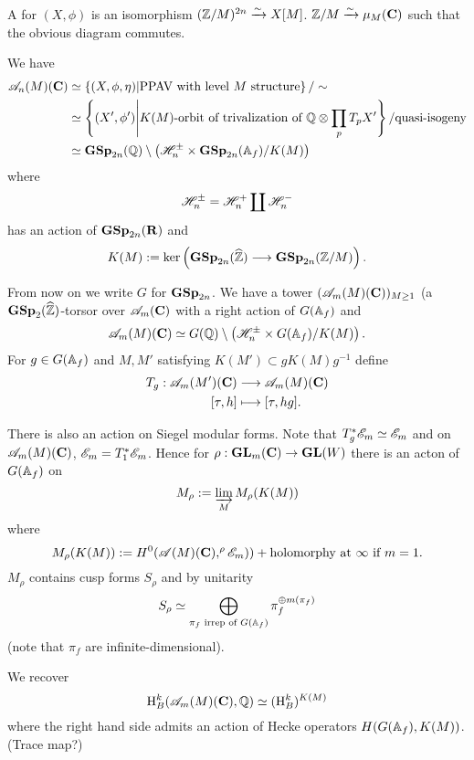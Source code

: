 \begin{definition}
	A  for $(X,\phi)$ is an isomorphism $(\mathbb Z /M)^{2n}\xrightarrow{\sim} X[M]$. $\mathbb Z /M\xrightarrow{\sim} \mu_M(\mathbf{C})$ such that the obvious diagram commutes.
\end{definition}
We have
\begin{align*}
	\mathscr{A}_n(M)(\mathbf{C}) &\simeq \left\{ (X,\phi,\eta) \middle| \text{PPAV with level }M\text{ structure} \right\} / \sim \\
			 &\simeq \left\{ (X',\phi') \middle| K(M)\text{-orbit of trivalization of }\mathbb Q\otimes \prod_p T_pX' \right\} / \text{quasi-isogeny} \\
			 &\simeq \mathbf{GSp}_{2n}(\mathbb Q) \setminus \left( \mathscr H_n^{\pm}\times \mathbf{GSp}_{2n}(\mathbb{A}_f) /K(M) \right) 
\end{align*}
where
\[
	\mathscr H_n^{\pm} = \mathscr H_n^{+} \coprod \mathscr H_n^{-}
\] 
has an action of $\mathbf{GSp}_{2n}(\mathbf{R})$ and
\[
	K(M) \defeq \ker \left( \GSp_{2n}(\wh{\Z}) \to \GSp_{2n}(\Z /M) \right) .
\] 

From now on we write $G$ for $\mathbf{GSp}_{2n}$.
We have a tower $(\mathscr{A}_m(M)(\mathbf{C}))_{M\ge 1}$ (a $\mathbf{GSp}_2(\widehat{\mathbb Z})$-torsor over $\mathscr{A}_m(\mathbf{C})$ with a right action of $G(\mathbb{A}_f)$ and
\[
	\mathscr{A}_m(M)(\mathbf{C}) \simeq G(\mathbb Q) \setminus \left( \mathscr H_n^{\pm} \times G(\mathbb{A}_f) /K(M) \right) .
\] 
For $g\in G(\mathbb{A}_f)$ and $M,M'$ satisfying $K(M')\subset gK(M)g^{-1}$ define
\begin{align*}
	T_g: \mathscr{A}_m(M')(\mathbf{C}) &\longrightarrow \mathscr{A}_m(M)(\mathbf{C}) \\
	[\tau, h] &\longmapsto [\tau, hg].
\end{align*}

There is also an action on Siegel modular forms. Note that $T_g^{*}\mathscr{E}_m\simeq \mathscr{E}_m$ and on $\mathscr{A}_m(M)(\mathbf{C})$, $\mathscr{E}_m=T_1^{*}\mathscr{E}_m$. Hence  for $\rho:\GL_m(\bb{C})\to \GL(W)$ there is an acton of $G(\mathbb{A}_f)$ on 
\[
M_\rho := \varinjlim_M M_\rho(K(M))
\] 
where
\[
M_\rho(K(M)) := H^{0}(\mathscr{A}(M)(\mathbf{C}), ^{\rho}\mathscr{E}_m)) + \text{holomorphy at }\infty\text{ if }m=1.
\] 
$M_\rho$ contains cusp forms $S_\rho$ and by unitarity
\[
S_\rho \simeq \bigoplus_{\pi_f\text{ irrep of }G(\mathbb{A}_f)}\pi_f^{\oplus m(\pi_f)}
\] 
(note that $\pi_f$ are infinite-dimensional).

We recover 
\[
	\mathrm{H}_B^{k}(\mathscr{A}_m(M)(\mathbf{C}),\mathbb Q) \simeq (\mathrm{H}_B^{k})^{K(M)}
\] 
where the right hand side admits an action of Hecke operators $H(G(\mathbb{A}_f),K(M))$. (Trace map?)

